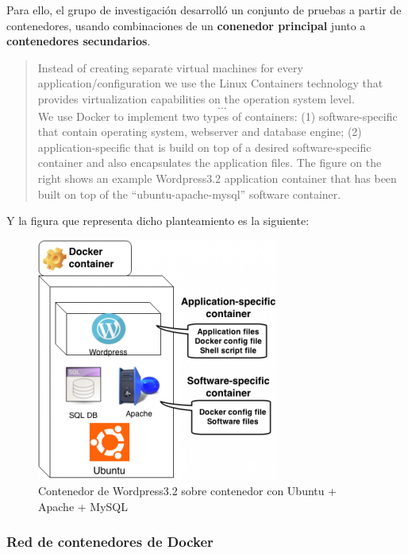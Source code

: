             Para ello, el grupo de investigación desarrolló un conjunto de pruebas a partir de contenedores, usando combinaciones de un \textbf{conenedor principal} junto a \textbf{contenedores secundarios}.

            \begin{quote}

                Instead of creating separate virtual machines for every application/configuration we use the Linux Containers technology that provides virtualization capabilities on the operation system level. \[...\] We use Docker to implement two types of containers: (1) software-specific that contain operating system, webserver and database engine; (2) application-specific that is build on top of a desired software-specific container and also encapsulates the application files. The figure on the right shows an example Wordpress3.2 application container that has been built on top of the “ubuntu-apache-mysql” software container.

            \end{quote}

            Y la figura que representa dicho planteamiento es la siguiente:

            \begin{figure}[htbp]
                \centering
                \includegraphics[scale=0.75]{images/Diagramas/Articulo.png}
                \caption{Contenedor de Wordpress3.2 sobre contenedor con Ubuntu + Apache + MySQL}
                \label{fig:articulo}
            \end{figure}

            \newpage
            

            \subsubsection{Red de contenedores de Docker}

